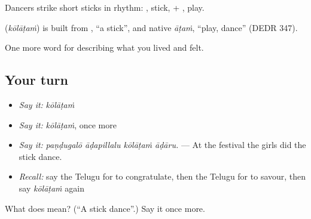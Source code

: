 Dancers strike short sticks in rhythm: , stick, + , play.

\begin{cousinweb}
\textbf{} (\emph{kōlāṭaṁ}) is built from , \textquotedblleft{}a stick\textquotedblright{}, and native \emph{āṭaṁ}, \textquotedblleft{}play, dance\textquotedblright{} (DEDR 347).
\end{cousinweb}

\begin{grammarlens}[title={What you've built}]
One more word for describing what you lived and felt.
\end{grammarlens}

\subsection*{Your turn}
\begin{itemize}
\raggedright
  \item \emph{Say it:} \emph{kōlāṭaṁ}
  \item \emph{Say it:} \emph{kōlāṭaṁ}, once more
  \item \emph{Say it:} \emph{paṇḍugalō āḍapillalu kōlāṭaṁ āḍāru.} — At the festival the girls did the stick dance.
  \item \emph{Recall:} say the Telugu for to congratulate, then the Telugu for to savour, then say \emph{kōlāṭaṁ} again
\end{itemize}

\begin{tcolorbox}[breakable,colback=teal!4,colframe=teal!35!black,title={Before you move on}]
What does  mean? (\textquotedblleft{}A stick dance\textquotedblright{}.) Say it once more.
\end{tcolorbox}
